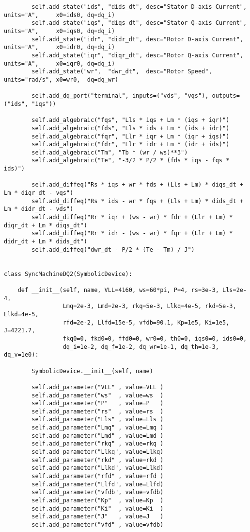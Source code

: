 \begin{lstlisting}
        self.add_state("ids", "dids_dt", desc="Stator D-axis Current", units="A",     x0=ids0, dq=dq_i)
        self.add_state("iqs", "diqs_dt", desc="Stator Q-axis Current", units="A",     x0=iqs0, dq=dq_i)
        self.add_state("idr", "didr_dt", desc="Rotor D-axis Current",  units="A",     x0=idr0, dq=dq_i)
        self.add_state("iqr", "diqr_dt", desc="Rotor Q-axis Current",  units="A",     x0=iqr0, dq=dq_i)
        self.add_state("wr",  "dwr_dt",  desc="Rotor Speed",           units="rad/s", x0=wr0,  dq=dq_wr)

        self.add_dq_port("terminal", inputs=("vds", "vqs"), outputs=("ids", "iqs"))

        self.add_algebraic("fqs", "Lls * iqs + Lm * (iqs + iqr)")
        self.add_algebraic("fds", "Lls * ids + Lm * (ids + idr)")
        self.add_algebraic("fqr", "Llr * iqr + Lm * (iqr + iqs)")
        self.add_algebraic("fdr", "Llr * idr + Lm * (idr + ids)")
        self.add_algebraic("Tm", "Tb * (wr / ws)**3")
        self.add_algebraic("Te", "-3/2 * P/2 * (fds * iqs - fqs * ids)")

        self.add_diffeq("Rs * iqs + wr * fds + (Lls + Lm) * diqs_dt + Lm * diqr_dt - vqs")
        self.add_diffeq("Rs * ids - wr * fqs + (Lls + Lm) * dids_dt + Lm * didr_dt - vds")
        self.add_diffeq("Rr * iqr + (ws - wr) * fdr + (Llr + Lm) * diqr_dt + Lm * diqs_dt")
        self.add_diffeq("Rr * idr - (ws - wr) * fqr + (Llr + Lm) * didr_dt + Lm * dids_dt")
        self.add_diffeq("dwr_dt - P/2 * (Te - Tm) / J")


class SyncMachineDQ2(SymbolicDevice):

    def __init__(self, name, VLL=4160, ws=60*pi, P=4, rs=3e-3, Lls=2e-4,
                 Lmq=2e-3, Lmd=2e-3, rkq=5e-3, Llkq=4e-5, rkd=5e-3, Llkd=4e-5,
                 rfd=2e-2, Llfd=15e-5, vfdb=90.1, Kp=1e5, Ki=1e5, J=4221.7,
                 fkq0=0, fkd0=0, ffd0=0, wr0=0, th0=0, iqs0=0, ids0=0,
                 dq_i=1e-2, dq_f=1e-2, dq_wr=1e-1, dq_th=1e-3, dq_v=1e0):

        SymbolicDevice.__init__(self, name)

        self.add_parameter("VLL" , value=VLL )
        self.add_parameter("ws"  , value=ws  )
        self.add_parameter("P"   , value=P   )
        self.add_parameter("rs"  , value=rs  )
        self.add_parameter("Lls" , value=Lls )
        self.add_parameter("Lmq" , value=Lmq )
        self.add_parameter("Lmd" , value=Lmd )
        self.add_parameter("rkq" , value=rkq )
        self.add_parameter("Llkq", value=Llkq)
        self.add_parameter("rkd" , value=rkd )
        self.add_parameter("Llkd", value=Llkd)
        self.add_parameter("rfd" , value=rfd )
        self.add_parameter("Llfd", value=Llfd)
        self.add_parameter("vfdb", value=vfdb)
        self.add_parameter("Kp"  , value=Kp  )
        self.add_parameter("Ki"  , value=Ki  )
        self.add_parameter("J"   , value=J   )
        self.add_parameter("vfd" , value=vfdb)


\end{lstlisting}
